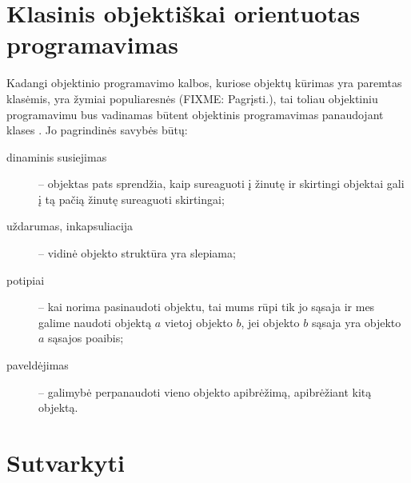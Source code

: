 \section{Klasinis objektiškai orientuotas programavimas}

Kadangi objektinio programavimo kalbos, kuriose objektų kūrimas yra
paremtas klasėmis, yra žymiai populiaresnės (FIXME: Pagrįsti.), tai
toliau objektiniu programavimu bus vadinamas būtent objektinis
programavimas panaudojant klases . Jo
pagrindinės savybės būtų:
\begin{description}
  \item[dinaminis susiejimas] – objektas pats sprendžia, kaip sureaguoti
    į žinutę ir skirtingi objektai gali į tą pačią žinutę sureaguoti
    skirtingai;
  \item[uždarumas, inkapsuliacija] – vidinė objekto struktūra yra
    slepiama;
  \item[potipiai] – kai norima pasinaudoti objektu, tai mums rūpi tik
    jo sąsaja ir mes galime naudoti objektą $a$ vietoj objekto $b$,
    jei objekto $b$ sąsaja yra objekto $a$ sąsajos poaibis;
  \item[paveldėjimas] – galimybė perpanaudoti vieno objekto apibrėžimą,
    apibrėžiant kitą objektą.
\end{description}

\section{Sutvarkyti}

